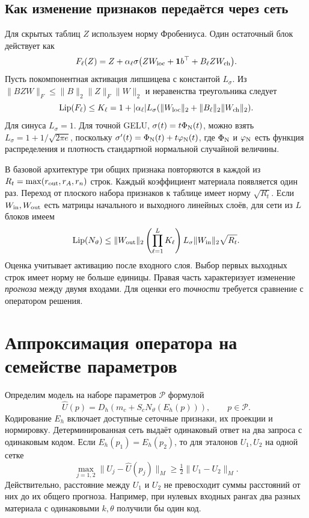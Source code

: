 \subsection{Как изменение признаков передаётся через сеть}
\label{rig:network-stability}
Для скрытых таблиц $Z$ используем норму Фробениуса. Один остаточный блок
действует как
\[
 F_\ell(Z)=Z+\alpha_\ell\sigma\bigl(ZW_{\rm loc}+\bm1 b^\top+
                                             B_\ell ZW_{\rm ch}\bigr).
\]
Пусть покомпонентная активация липшицева с константой $L_\sigma$.
Из $\|BZW\|_F\le\|B\|_2\|Z\|_F\|W\|_2$ и неравенства треугольника
следует
\begin{equation}
 \operatorname{Lip}(F_\ell)\le K_\ell=
 1+|\alpha_\ell|L_\sigma
 (\|W_{\rm loc}\|_2+\|B_\ell\|_2\|W_{\rm ch}\|_2).
 \label{rig:block-lip}
\end{equation}
Для синуса $L_\sigma=1$. Для точной GELU, $\sigma(t)=t\Phi_{\rm N}(t)$,
можно взять $L_\sigma=1+1/\sqrt{2\pi e}$, поскольку
$\sigma'(t)=\Phi_{\rm N}(t)+t\varphi_{\rm N}(t)$, где $\Phi_{\rm N}$ и
$\varphi_{\rm N}$ есть функция распределения и плотность стандартной
нормальной случайной величины.

В базовой архитектуре три общих признака повторяются в каждой из
$R_t=\max(r_{\rm out},r_A,r_n)$ строк. Каждый коэффициент материала
появляется один раз. Переход от плоского набора признаков к таблице
имеет норму $\sqrt{R_t}$. Если $W_{\rm in},W_{\rm out}$ есть матрицы
начального и выходного линейных слоёв, для сети из $L$ блоков имеем
\begin{equation}
 \operatorname{Lip}(N_\vartheta)\le\|W_{\rm out}\|_2
 \left(\prod_{\ell=1}^L K_\ell\right)
 L_\sigma\|W_{\rm in}\|_2\sqrt{R_t}.\label{rig:network-lip}
\end{equation}
Оценка учитывает активацию после входного слоя. Выбор первых выходных
строк имеет норму не больше единицы. Правая часть характеризует изменение
\emph{прогноза} между двумя входами. Для оценки его \emph{точности}
требуется сравнение с оператором решения.

\section{Аппроксимация оператора на семействе параметров}
\label{rig:identifiability}
\label{rig:total-error}

Определим модель на наборе параметров $\mathcal P$ формулой
\begin{equation}
 \widehat U(p)=D_h\!\left(m_c+S_cN_\vartheta(E_h(p))\right),\qquad
 p\in\mathcal P.\label{rig:factorized-model}
\end{equation}
Кодирование $E_h$ включает доступные сеточные признаки, их проекции
и нормировку. Детерминированная сеть выдаёт одинаковый ответ на два
запроса с одинаковым кодом. Если $E_h(p_1)=E_h(p_2)$, то для эталонов
$U_1,U_2$ на одной сетке
\begin{equation}
 \max_{j=1,2}\|U_j-\widehat U(p_j)\|_M\ge
                   \tfrac12\|U_1-U_2\|_M.\label{rig:input-floor}
\end{equation}
Действительно, расстояние между $U_1$ и $U_2$ не превосходит суммы
расстояний от них до их общего прогноза. Например, при нулевых входных
рангах два разных материала с одинаковыми $k,\theta$ получили бы один код.

